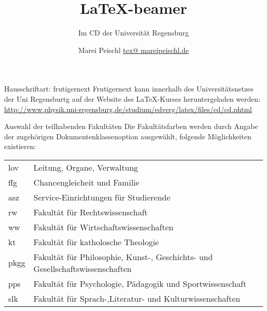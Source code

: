\documentclass[aspectratio=169,ngerman,ph]{URbeamer} %
\title{\LaTeX{}-beamer}
\institute{Fakultät für Physik}
\subtitle{Im CD der Universität Regensburg}
\author[Marei Peischl]{Marei Peischl \href{mailto:tex@mareipeischl.de}{tex@ mareipeischl.de}}
\begin{document}
\frame[plain]{\titlepage}

\begin{frame}{Hausschriftart: frutigernext}
	Frutigernext kann innerhalb des Universitätsnetzes der Uni Regensburtg auf der Website des \LaTeX{}-Kurses heruntergeladen werden: \url{http://www.physik.uni-regensburg.de/studium/edverg/latex/files/cd/cd.phtml}
\end{frame}

\begin{frame}{Auswahl der teilhabenden Fakultäten}
Die Fakultätsfarben werden durch Angabe der zugehörigen Dokumentenklassenoption ausgewählt, folgende Möglichkeiten existieren:
\begin{tabularx}{\linewidth}{lX}
lov&Leitung, Organe, Verwaltung\\
ffg&Chancengleicheit und Familie\\
asz&Service-Einrichtungen für Studierende\\
rw&Fakultät für Rechtswissenschaft\\
ww&Fakultät für Wirtschaftswissenschaften\\
kt&Fakultät für katholosche Theologie\\
pkgg&Fakultät für Philosophie, Kunst-, Geschichts- und Gesellschaftswissenschaften\\
pps&Fakultät für Psychologie, Pädagogik und Sportwissenschaft\\
slk&Fakultät für Sprach-,Literatur- und Kulturwissenschaften\\
\end{tabularx}
\end{frame}
\end{document}
